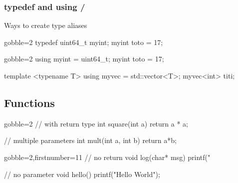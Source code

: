\begin{frame}[fragile]
  \frametitle{typedef and using \hfill {} / }
  Ways to create type aliases
  \begin{alertblock}{}
    \begin{cppcode*}{gobble=2}
      typedef uint64_t myint;
      myint toto = 17;
    \end{cppcode*}
  \end{alertblock}
  \begin{exampleblock}{}
    \begin{cppcode*}{gobble=2}
      using myint = uint64_t;
      myint toto = 17;

      template <typename T> using myvec = std::vector<T>;
      myvec<int> titi;
    \end{cppcode*}
  \end{exampleblock}
\end{frame}

\subsection[$f()$]{Functions}

\begin{frame}[fragile]
  \begin{multicols}{2}
    \begin{cppcode*}{gobble=2}
      // with return type
      int square(int a) {
        return a * a;
      }

      // multiple parameters
      int mult(int a,
               int b) {
        return a*b;
      }
    \end{cppcode*}
    \columnbreak
    \begin{cppcode*}{gobble=2,firstnumber=11}
      // no return
      void log(char* msg) {
        printf("%
      }

      // no parameter
      void hello() {
        printf("Hello World");
      }
    \end{cppcode*}
  \end{multicols}
\end{frame}


